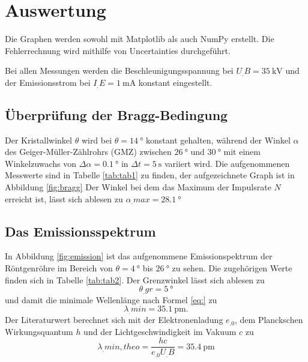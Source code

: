 \section{Auswertung}
\label{sec:Auswertung}


Die Graphen werden sowohl mit Matplotlib \cite{matplotlib} als auch NumPy \cite{numpy} erstellt. Die Fehlerrechnung wird mithilfe von Uncertainties \cite{uncertainties} durchgeführt.

Bei allen Messungen werden die Beschleunigungsspannung bei $U_.B=\SI{35}{\kilo\volt}$ und der Emissionsstrom bei $I_.E=\SI{1}{\milli\ampere}$ konstant eingestellt.

\subsection{Überprüfung der Bragg-Bedingung}
Der Kristallwinkel $\theta$ wird bei $\theta= \SI{14}{\degree}$ konstant gehalten, während der Winkel $\alpha$ des Geiger-Müller-Zählrohrs (GMZ) zwischen $\SI{26}{\degree}$ und $\SI{30}{\degree}$ mit einem Winkelzuwachs von $\Delta \alpha = \SI{0,1}{\degree}$ in $\Delta t = \SI{5}{\second}$ variiert wird.
Die aufgenommenen Messwerte sind in Tabelle \ref{tab:tab1} zu finden, der aufgezeichnete Graph ist in Abbildung \ref{fig:bragg}
Der Winkel bei dem das Maximum der Impulsrate $N$ erreicht ist, lässt sich ablesen zu $\alpha_.{max}=\SI{28,1}{\degree}$

\subsection{Das Emissionsspektrum}
In Abbildung \ref{fig:emission} ist das aufgenommene Emissionspektrum der Röntgenröhre im Bereich von $\theta=\SI{4}{\degree}$ bis $\SI{26}{\degree}$ zu sehen. Die zugehörigen Werte finden sich in Tabelle \ref{tab:tab2}.
Der Grenzwinkel lässt sich ablesen zu 
\[\theta_.{gr}=\SI{5}{\degree}\]
und damit die minimale Wellenlänge nach Formel \eqref{eq:} zu
\[
\lambda_.{min}=\SI{35,1}{\pico\metre}\text{.}
\]
Der Literaturwert berechnet sich mit der Elektronenladung $e_.0$, dem Planckschen Wirkungsquantum $h$ und der Lichtgeschwindigkeit im Vakuum $c$ zu
\[
\lambda_.{min,theo}=\frac{hc}{e_.0U_.B}=\SI{35,4}{\pico\metre}
\]